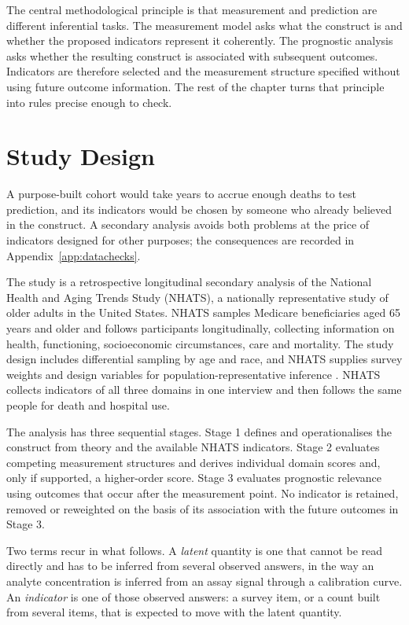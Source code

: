 The central methodological principle is that measurement and prediction are different inferential tasks. The measurement model asks what the construct is and whether the proposed indicators represent it coherently. The prognostic analysis asks whether the resulting construct is associated with subsequent outcomes. Indicators are therefore selected and the measurement structure specified without using future outcome information. The rest of the chapter turns that principle into rules precise enough to check.

\section{Study Design}
\label{sec:design}

A purpose-built cohort would take years to accrue enough deaths to test prediction, and its indicators would be chosen by someone who already believed in the construct. A secondary analysis avoids both problems at the price of indicators designed for other purposes; the consequences are recorded in Appendix~\ref{app:datachecks}.

The study is a retrospective longitudinal secondary analysis of the National Health and Aging Trends Study (NHATS), a nationally representative study of older adults in the United States. NHATS samples Medicare beneficiaries aged 65 years and older and follows participants longitudinally, collecting information on health, functioning, socioeconomic circumstances, care and mortality. The study design includes differential sampling by age and race, and NHATS supplies survey weights and design variables for population-representative inference \citep{nhats_cohort_2019,nhats_methods_2026}. NHATS collects indicators of all three domains in one interview and then follows the same people for death and hospital use.

The analysis has three sequential stages. Stage 1 defines and operationalises the construct from theory and the available NHATS indicators. Stage 2 evaluates competing measurement structures and derives individual domain scores and, only if supported, a higher-order score. Stage 3 evaluates prognostic relevance using outcomes that occur after the measurement point. No indicator is retained, removed or reweighted on the basis of its association with the future outcomes in Stage 3.

Two terms recur in what follows. A \emph{latent} quantity is one that cannot be read directly and has to be inferred from several observed answers, in the way an analyte concentration is inferred from an assay signal through a calibration curve. An \emph{indicator} is one of those observed answers: a survey item, or a count built from several items, that is expected to move with the latent quantity.


